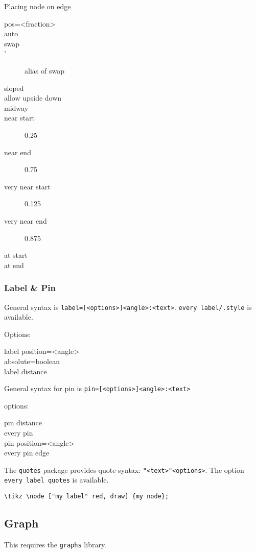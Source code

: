 Placing node on edge
\begin{description}
\item [pos=<fraction>]
\item [auto]
\item [swap]
\item ['] alias of swap
\item [sloped]
\item [allow upside down]
\item [midway]
\item [near start] 0.25
\item [near end] 0.75
\item [very near start] 0.125
\item [very near end] 0.875
\item [at start]
\item [at end]
\end{description}

\subsubsection{Label \& Pin}
General syntax is \texttt{label=[<options>]<angle>:<text>}.
\texttt{every label/.style} is available.

Options:
\begin{description}
\item [label position=<angle>]
\item [absolute=boolean]
\item [label distance]
\end{description}

General syntax for pin is \texttt{pin=[<options>]<angle>:<text>}

options:
\begin{description}
\item [pin distance]
\item [every pin]
\item [pin position=<angle>]
\item [every pin edge]
\end{description}

The \texttt{quotes} package provides quote syntax:
\texttt{"<text>"<options>}. The option \texttt{every label quotes} is
available.
\begin{lstlisting}
\tikz \node ["my label" red, draw] {my node};
\end{lstlisting}


\subsection{Graph}
This requires the \texttt{graphs} library.

